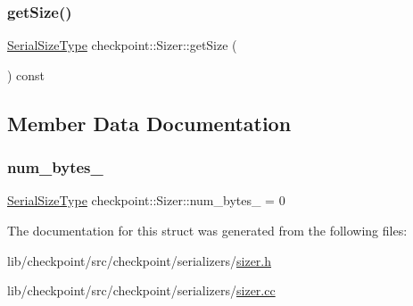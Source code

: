 \subsubsection{\texorpdfstring{get\+Size()}{getSize()}}
{\footnotesize\ttfamily \hyperlink{namespacecheckpoint_a083f6674da3f94c2901b18c6d238217c}{Serial\+Size\+Type} checkpoint\+::\+Sizer\+::get\+Size (\begin{DoxyParamCaption}{ }\end{DoxyParamCaption}) const}



\subsection{Member Data Documentation}
\mbox{\label{structcheckpoint_1_1_sizer_a94e13ec6a5656d3b82dc787c00390bf2}} 
\subsubsection{\texorpdfstring{num\+\_\+bytes\+\_\+}{num\_bytes\_}}
{\footnotesize\ttfamily \hyperlink{namespacecheckpoint_a083f6674da3f94c2901b18c6d238217c}{Serial\+Size\+Type} checkpoint\+::\+Sizer\+::num\+\_\+bytes\+\_\+ = 0\hspace{0.3cm}{\ttfamily [private]}}



The documentation for this struct was generated from the following files\+:\begin{DoxyCompactItemize}
\item 
lib/checkpoint/src/checkpoint/serializers/\hyperlink{lib_2checkpoint_2src_2checkpoint_2serializers_2sizer_8h}{sizer.\+h}\item 
lib/checkpoint/src/checkpoint/serializers/\hyperlink{sizer_8cc}{sizer.\+cc}\end{DoxyCompactItemize}
